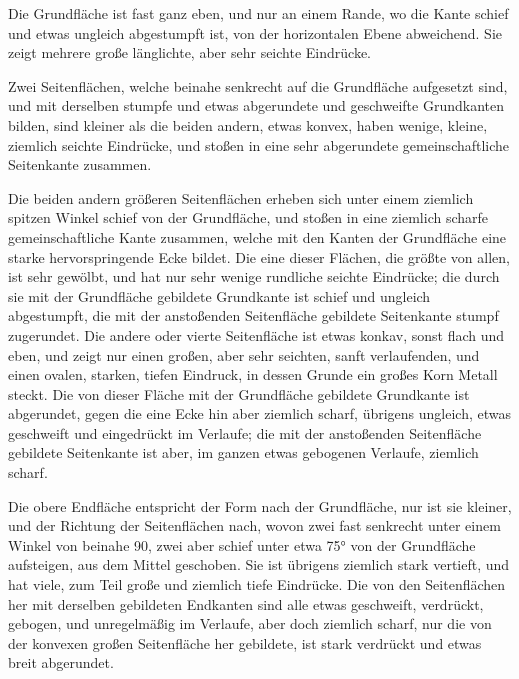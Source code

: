 \documentclass[a4paper, 11pt, oneside, german]{article}
\begin{document}
Die Grundfläche ist fast ganz eben, und nur an einem Rande, wo die Kante schief und etwas ungleich abgestumpft ist, von der horizontalen Ebene abweichend. Sie zeigt mehrere große länglichte, aber sehr seichte Eindrücke.

Zwei Seitenflächen, welche beinahe senkrecht auf die Grundfläche aufgesetzt sind, und mit derselben stumpfe und etwas abgerundete und geschweifte Grundkanten bilden, sind kleiner als die beiden andern, etwas konvex, haben wenige, kleine, ziemlich seichte Eindrücke, und stoßen in eine sehr abgerundete gemeinschaftliche Seitenkante zusammen.

Die beiden andern größeren Seitenflächen erheben sich unter einem ziemlich spitzen Winkel schief von der Grundfläche, und stoßen in eine ziemlich scharfe gemeinschaftliche Kante zusammen, welche mit den Kanten der Grundfläche eine starke hervorspringende Ecke bildet. Die eine dieser Flächen, die größte von allen, ist sehr gewölbt, und hat nur sehr wenige rundliche seichte Eindrücke; die durch sie mit der Grundfläche gebildete Grundkante ist schief und ungleich abgestumpft, die mit der anstoßenden Seitenfläche gebildete Seitenkante stumpf zugerundet. Die andere oder vierte Seitenfläche ist etwas konkav, sonst flach und eben, und zeigt nur einen großen, aber sehr seichten, sanft verlaufenden, und einen ovalen, starken, tiefen Eindruck, in dessen Grunde ein großes Korn Metall steckt. Die von dieser Fläche mit der Grundfläche gebildete Grundkante ist abgerundet, gegen die eine Ecke hin aber ziemlich scharf, übrigens ungleich, etwas geschweift und eingedrückt im Verlaufe; die mit der anstoßenden Seitenfläche gebildete Seitenkante ist aber, im ganzen etwas gebogenen Verlaufe, ziemlich scharf.

Die obere Endfläche entspricht der Form nach der Grundfläche, nur ist sie kleiner, und der Richtung der Seitenflächen nach, wovon zwei fast senkrecht unter einem Winkel von beinahe 90, zwei aber schief unter etwa 75° von der Grundfläche aufsteigen, aus dem Mittel geschoben. Sie ist übrigens ziemlich stark vertieft, und hat viele, zum Teil große und ziemlich tiefe Eindrücke. Die von den Seitenflächen her mit derselben gebildeten Endkanten sind alle etwas geschweift, verdrückt, gebogen, und unregelmäßig im Verlaufe, aber doch ziemlich scharf, nur die von der konvexen großen Seitenfläche her gebildete, ist stark verdrückt und etwas breit abgerundet.
\end{document}
